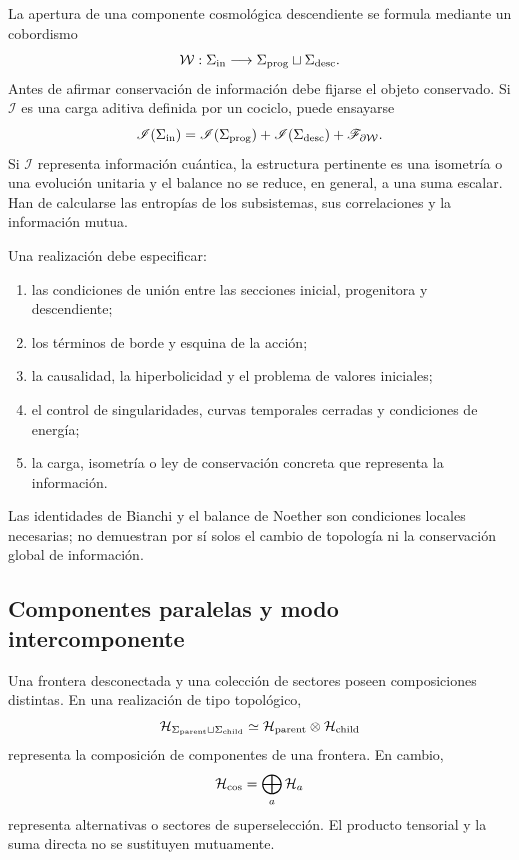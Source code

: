 La apertura de una componente cosmológica descendiente se formula mediante un cobordismo
\[
 \mathcal W:
 \Sigma_{\rm in}
 \longrightarrow
 \Sigma_{\rm prog}\sqcup\Sigma_{\rm desc}.
\]
Antes de afirmar conservación de información debe fijarse el objeto
conservado. Si \(\mathscr I\) es una carga aditiva definida por un cociclo,
puede ensayarse
\[
 \mathscr I(\Sigma_{\rm in})
 =
 \mathscr I(\Sigma_{\rm prog})
 +\mathscr I(\Sigma_{\rm desc})
 +\mathscr F_{\partial\mathcal W}.
\]
Si \(\mathscr I\) representa información cuántica, la estructura pertinente
es una isometría o una evolución unitaria y el balance no se reduce, en
general, a una suma escalar. Han de calcularse las entropías de los
subsistemas, sus correlaciones y la información mutua.

Una realización debe especificar:
\begin{enumerate}
 \item las condiciones de unión entre las secciones inicial, progenitora y
 descendiente;
 \item los términos de borde y esquina de la acción;
 \item la causalidad, la hiperbolicidad y el problema de valores iniciales;
 \item el control de singularidades, curvas temporales cerradas y condiciones
 de energía;
 \item la carga, isometría o ley de conservación concreta que representa la
 información.
\end{enumerate}
Las identidades de Bianchi y el balance de Noether son condiciones locales
necesarias; no demuestran por sí solos el cambio de topología ni la
conservación global de información.

\subsection{Componentes paralelas y modo intercomponente}
\label{sec:componentes-cosmologicas-paralelas}

Una frontera desconectada y una colección de sectores poseen composiciones
distintas. En una realización de tipo topológico,
\[
 \mathcal H_{\Sigma_{\rm parent}\sqcup\Sigma_{\rm child}}
 \simeq
 \mathcal H_{\rm parent}\otimes\mathcal H_{\rm child}
\]
representa la composición de componentes de una frontera. En cambio,
\[
 \mathcal H_{\rm cos}
 =\bigoplus_a\mathcal H_a
\]
representa alternativas o sectores de superselección. El producto tensorial
y la suma directa no se sustituyen mutuamente.


